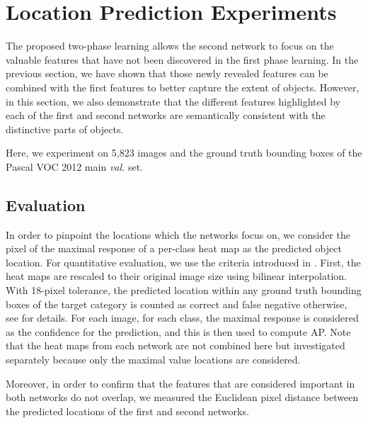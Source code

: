 \documentclass[10pt,twocolumn,letterpaper]{article}
\begin{document}


\section{Location Prediction Experiments}
\label{sec:location}
The proposed two-phase learning allows the second network to focus on the valuable features that have not been discovered in the first phase learning. In the previous section, we have shown that those newly revealed features can be combined with the first features to better capture the extent of objects. However, in this section, we also demonstrate that the different features highlighted by each of the first and second networks are semantically consistent with the distinctive parts of objects.

Here, we experiment on 5,823 images and the ground truth bounding boxes of the Pascal VOC 2012 main \textit{val.} set.



\subsection{Evaluation}
In order to pinpoint the locations which the networks focus on, we consider the pixel of the maximal response of a per-class heat map as the predicted object location. For quantitative evaluation, we use the criteria introduced in \cite{Oquab15}. First, the heat maps are rescaled to their original image size using bilinear interpolation. With 18-pixel tolerance, the predicted location within any ground truth bounding boxes of the target category is counted as correct and false negative otherwise, see \cite{Oquab15} for details. For each image, for each class, the maximal response is considered as the confidence for the prediction, and this is then used to compute AP. Note that the heat maps from each network are not combined here but investigated separately because only the maximal value locations are considered.

Moreover, in order to confirm that the features that are considered important in both networks do not overlap, we measured the Euclidean pixel distance between the predicted locations of the first and second networks.
\end{document}
